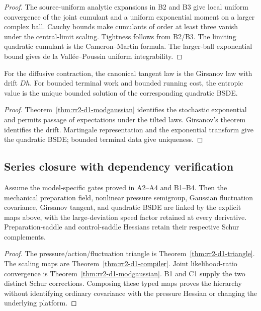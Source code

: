 \begin{proof}
The source-uniform analytic expansions in B2 and B3 give local uniform
convergence of the joint cumulant and a uniform exponential moment on a
larger complex ball.  Cauchy bounds make cumulants of order at least three
vanish under the central-limit scaling.  Tightness follows from B2/B3.
The limiting quadratic cumulant is the Cameron--Martin formula.  The
larger-ball exponential bound gives de la Vall\'ee--Poussin uniform
integrability.
\end{proof}

\begin{corollary}
\label{cor:rr2-d1-bsde}
For the diffusive contraction, the canonical tangent law is the Girsanov
law with drift \(D h\).  For bounded terminal work and bounded running cost,
the entropic value is the unique bounded solution of the corresponding
quadratic BSDE.
\end{corollary}

\begin{proof}
Theorem~\ref{thm:rr2-d1-modgaussian} identifies the stochastic exponential
and permits passage of expectations under the tilted laws.  Girsanov's
theorem identifies the drift.  Martingale representation and the exponential
transform give the quadratic BSDE; bounded terminal data give uniqueness.
\end{proof}

\subsection{Series closure with dependency verification}

\begin{theorem}
\label{thm:rr2-d1-main}
Assume the model-specific gates proved in A2--A4 and B1--B4.  Then the
mechanical preparation field, nonlinear pressure semigroup, Gaussian
fluctuation covariance, Girsanov tangent, and quadratic BSDE are linked by
the explicit maps above, with the large-deviation speed factor retained at
every derivative.  Preparation-saddle and control-saddle Hessians retain
their respective Schur complements.
\end{theorem}

\begin{proof}
The pressure/action/fluctuation triangle is
Theorem~\ref{thm:rr2-d1-triangle}.  The scaling maps are
Theorem~\ref{thm:rr2-d1-compiler}.  Joint likelihood-ratio convergence is
Theorem~\ref{thm:rr2-d1-modgaussian}.  B1 and C1 supply the two distinct
Schur corrections.  Composing these typed maps proves the hierarchy without
identifying ordinary covariance with the pressure Hessian or changing the
underlying platform.
\end{proof}
